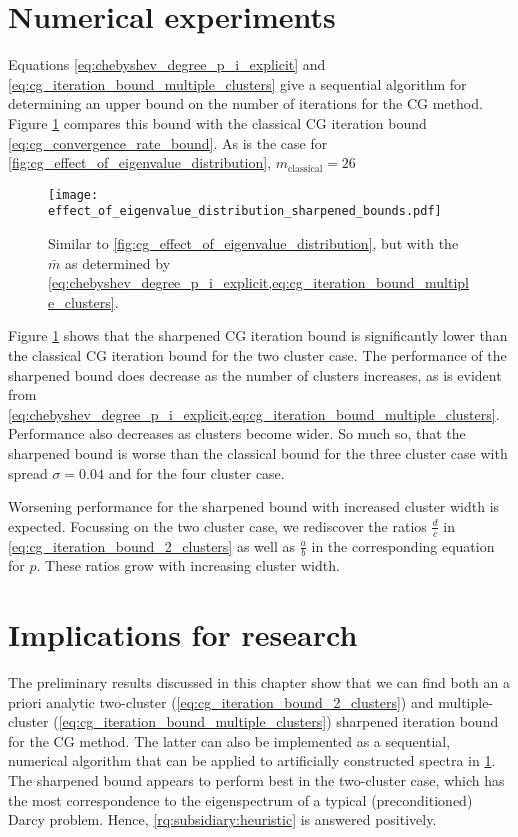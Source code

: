 \section{Numerical experiments}\label{sec:cg_sharpened_convrate_numerical_experiments}
Equations \ref{eq:chebyshev_degree_p_i_explicit} and \ref{eq:cg_iteration_bound_multiple_clusters} give a sequential algorithm for determining an upper bound on the number of iterations for the CG method. Figure \ref{fig:cg_sharpened_bound} compares this bound with the classical CG iteration bound \cref{eq:cg_convergence_rate_bound}. As is the case for \cref{fig:cg_effect_of_eigenvalue_distribution}, $m_{\text{classical}} = 26$
\begin{figure}[H] 
    \centering
    \texttt{[image: effect\_of\_eigenvalue\_distribution\_sharpened\_bounds.pdf]}
    \caption{Similar to \cref{fig:cg_effect_of_eigenvalue_distribution}, but with the $\bar{m}$ as determined by \cref{eq:chebyshev_degree_p_i_explicit,eq:cg_iteration_bound_multiple_clusters}.}
    \label{fig:cg_sharpened_bound}
\end{figure}
Figure \ref{fig:cg_sharpened_bound} shows that the sharpened CG iteration bound is significantly lower than the classical CG iteration bound for the two cluster case. The performance of the sharpened bound does decrease as the number of clusters increases, as is evident from \cref{eq:chebyshev_degree_p_i_explicit,eq:cg_iteration_bound_multiple_clusters}. Performance also decreases as clusters become wider. So much so, that the sharpened bound is worse than the classical bound for the three cluster case with spread $\sigma = 0.04$ and for the four cluster case.

Worsening performance for the sharpened bound with increased cluster width is expected. Focussing on the two cluster case, we rediscover the ratios $\frac{d}{c}$ in \cref{eq:cg_iteration_bound_2_clusters} as well as $\frac{a}{b}$ in the corresponding equation for $p$. These ratios grow with increasing cluster width.

\section{Implications for research}\label{sec:cg_sharpened_convrate_implications}
The preliminary results discussed in this chapter show that we can find both an a priori analytic two-cluster (\cref{eq:cg_iteration_bound_2_clusters}) and multiple-cluster (\cref{eq:cg_iteration_bound_multiple_clusters}) sharpened iteration bound for the CG method. The latter can also be implemented as a sequential, numerical algorithm that can be applied to artificially constructed spectra in \cref{fig:cg_sharpened_bound}. The sharpened bound appears to perform best in the two-cluster case, which has the most correspondence to the eigenspectrum of a typical (preconditioned) Darcy problem. Hence, \ref{rq:subsidiary:heuristic} is answered positively. 

